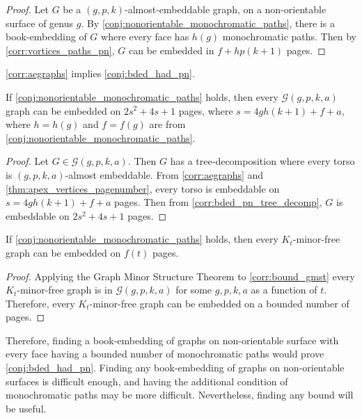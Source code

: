 \begin{proof}
	Let $G$ be a $(g, p, k)$-almost-embeddable graph, on a non-orientable surface of genus $g$. By \cref{conj:nonorientable_monochromatic_paths}, there is a book-embedding of $G$ where every face has $h(g)$ monochromatic paths. Then by \cref{corr:vortices_paths_pn}, $G$ can be embedded in $f + h p (k+1)$ pages. 
\end{proof}

\cref{corr:aegraphs} implies \cref{conj:bded_had_pn}.
\begin{corollary}\label{corr:bound_gmst}
	If \cref{conj:nonorientable_monochromatic_paths} holds, then every $\mathcal{G}(g, p, k, a)$ graph can be embedded on $2s^2 + 4s + 1$ pages, where $s =  4g h (k + 1) + f + a$, where $h = h(g)$ and $f = f(g)$ are from \cref{conj:nonorientable_monochromatic_paths}. 
\end{corollary}

\begin{proof}
	Let $G \in \mathcal{G}(g, p, k, a)$. Then $G$ has a tree-decomposition where every torso is $(g, p, k, a)$-almost embeddable. From \cref{corr:aegraphs} and \cref{thm:apex_vertices_pagenumber}, every torso is embeddable on $s = 4g h (k + 1) + f + a$ pages. Then from \cref{corr:bded_pn_tree_decomp}, $G$ is embeddable on $2s^2 + 4s + 1$ pages.
\end{proof}

\begin{corollary}
	If \cref{conj:nonorientable_monochromatic_paths} holds, then every $K_t$-minor-free graph can be embedded on $f(t)$ pages. 
\end{corollary}

\begin{proof}
	Applying the Graph Minor Structure Theorem to \cref{corr:bound_gmst} every $K_t$-minor-free graph is in $\mathcal{G}(g, p, k, a)$ for some $g, p, k, a$ as a function of $t$. Therefore, every $K_t$-minor-free graph can be embedded on a bounded number of pages. 
\end{proof}

Therefore, finding a book-embedding of graphs on non-orientable surface with every face having a bounded number of monochromatic paths would prove \cref{conj:bded_had_pn}. Finding any book-embedding of graphs on non-orientable surfaces is difficult enough, and having the additional condition of monochromatic paths may be more difficult. Nevertheless, finding any bound will be useful.